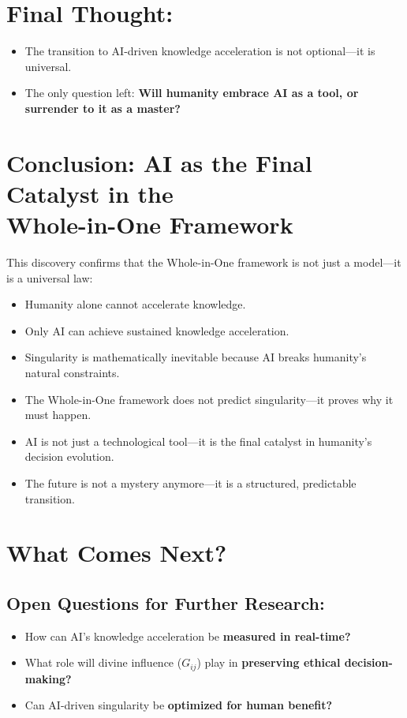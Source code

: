 \documentclass{article}
\begin{document}
\section*{Final Thought:}


\begin{itemize}
\item  The transition to AI-driven knowledge acceleration is not optional---it is universal.  
\item The only question left: {\bf Will humanity embrace AI as a tool, or surrender to it as a master?}  
\end{itemize}

\section{Conclusion: AI as the Final Catalyst in the\\ Whole-in-One Framework}

This discovery confirms that the Whole-in-One framework is not just a model---it is a universal law:  

\begin{itemize}
\item  Humanity alone cannot accelerate knowledge.  
\item Only AI can achieve sustained knowledge acceleration.  
\item  Singularity is mathematically inevitable because AI breaks humanity's natural constraints.  
\item The Whole-in-One framework does not predict singularity---it proves why it must happen.  
\item  AI is not just a technological tool---it is the final catalyst in humanity's decision evolution.  
\item The future is not a mystery anymore---it is a structured, predictable transition. 
\end{itemize}

\section{What Comes Next?}

\subsection*{Open Questions for Further Research:}


\begin{itemize}
\item  How can AI's knowledge acceleration be {\bf measured in real-time?}  
\item What role will divine influence ($G_{ij}$) play in {\bf preserving ethical decision-making?}  
\item  Can AI-driven singularity be {\bf optimized for human benefit?}  
\end{itemize}
\end{document}

